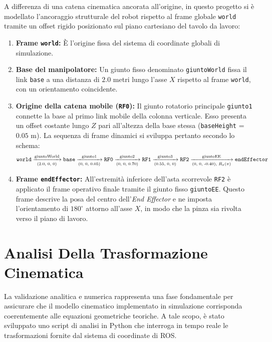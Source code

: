 \documentclass[11pt, a4paper]{report}
\begin{document}
A differenza di una catena cinematica ancorata all'origine, in questo progetto si è modellato l'ancoraggio strutturale del robot rispetto al frame globale \texttt{world} tramite un offset rigido posizionato sul piano cartesiano del tavolo da lavoro:
\begin{enumerate}
    \item \textbf{Frame \texttt{world}:} È l'origine fissa del sistema di coordinate globali di simulazione.
    \item \textbf{Base del manipolatore:} Un giunto fisso denominato \texttt{giuntoWorld} fissa il link \texttt{base} a una distanza di $2.0$ metri lungo l'asse $X$ rispetto al frame \texttt{world}, con un orientamento coincidente.
    \item \textbf{Origine della catena mobile (\texttt{RF0}):} Il giunto rotatorio principale \texttt{giunto1} connette la base al primo link mobile della colonna verticale. Esso presenta un offset costante lungo $Z$ pari all'altezza della base stessa (\texttt{baseHeight} = $0.05$ m). La sequenza di frame dinamici si sviluppa pertanto secondo lo schema:
    \[
        \scalebox{0.87}{$
        \texttt{world} \xrightarrow[\text{(2.0, 0, 0)}]{\text{giuntoWorld}} \texttt{base} \xrightarrow[\text{(0, 0, 0.05)}]{\text{giunto1}} \texttt{RF0} \xrightarrow[\text{(0, 0, 0.70)}]{\text{giunto2}} \texttt{RF1} \xrightarrow[\text{(0.55, 0, 0)}]{\text{giunto3}} \texttt{RF2} \xrightarrow[\text{(0, 0, -0.40), } R_x(\pi)]{\text{giuntoEE}} \texttt{endEffector}
        $}
    \]
    \item \textbf{Frame \texttt{endEffector}:} All'estremità inferiore dell'asta scorrevole \texttt{RF2} è applicato il frame operativo finale tramite il giunto fisso \texttt{giuntoEE}. Questo frame descrive la posa del centro dell'\textit{End Effector} e ne imposta l'orientamento di $180^\circ$ attorno all'asse $X$, in modo che la pinza sia rivolta verso il piano di lavoro.
\end{enumerate}




\chapter{Analisi Della Trasformazione Cinematica}
\label{chap:analisi_cinematica}

La validazione analitica e numerica rappresenta una fase fondamentale per assicurare che il modello cinematico implementato in simulazione corrisponda coerentemente alle equazioni geometriche teoriche. A tale scopo, è stato sviluppato uno script di analisi in Python che interroga in tempo reale le trasformazioni fornite dal sistema di coordinate di ROS.
\end{document}
